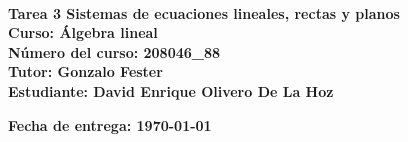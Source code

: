 \begin{titlepage}
    \centering
    \fontsize{12pt}{14}\

    \vspace{3cm}
    \normalsize \textbf{\huge Tarea 3 Sistemas de ecuaciones lineales, rectas y planos} \\
    \normalsize \textbf{Curso: Álgebra lineal} \\
    \normalsize \textbf{Número del curso: 208046\_88} \\
    \normalsize \textbf{Tutor: Gonzalo Fester} \\
    \normalsize \textbf{Estudiante: David Enrique Olivero De La Hoz}
    
    \vfil
    \begin{flushright}
        \normalsize \textbf{Fecha de entrega: \today}
    \end{flushright}
    \normalsize \textbf{}
\end{titlepage}
\newpage